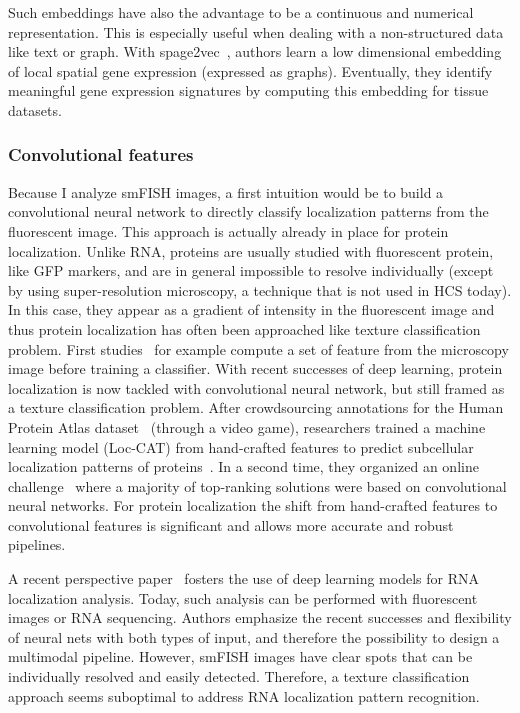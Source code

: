 Such embeddings have also the advantage to be a continuous and numerical representation.
This is especially useful when dealing with a non-structured data like text or graph.
With spage2vec~\cite{Partel_2021}, authors learn a low dimensional embedding of local spatial gene expression (expressed as graphs).
Eventually, they identify meaningful gene expression signatures by computing this embedding for tissue datasets.

\subsubsection{Convolutional features}

Because I analyze smFISH images, a first intuition would be to build a convolutional neural network to directly classify localization patterns from the fluorescent image.
This approach is actually already in place for protein localization.
Unlike RNA, proteins are usually studied with fluorescent protein, like \ac{GFP} markers, and are in general impossible to resolve individually (except by using super-resolution microscopy, a technique that is not used in HCS today).
In this case, they appear as a gradient of intensity in the fluorescent image and thus protein localization has often been approached like texture classification problem.
First studies~\cite{boland_automated_1998} for example compute a set of feature from the microscopy image before training a classifier.
With recent successes of deep learning, protein localization is now tackled with convolutional neural network, but still framed as a texture classification problem.
After crowdsourcing annotations for the Human Protein Atlas dataset~\cite{Uhlen_2015} (through a video game), researchers trained a machine learning model (Loc-CAT) from hand-crafted features to predict subcellular localization patterns of proteins~\cite{sullivan_deep_2018}.
In a second time, they organized an online challenge~\cite{ouyang_analysis_2019} where a majority of top-ranking solutions were based on convolutional neural networks.
For protein localization the shift from hand-crafted features to convolutional features is significant and allows more accurate and robust pipelines.

A recent perspective paper~\cite{Savulescu_2021} fosters the use of deep learning models for RNA localization analysis.
Today, such analysis can be performed with fluorescent images or RNA sequencing.
Authors emphasize the recent successes and flexibility of neural nets with both types of input, and therefore the possibility to design a multimodal pipeline.
However, smFISH images have clear spots that can be individually resolved and easily detected.
Therefore, a texture classification approach seems suboptimal to address \ac{RNA} localization pattern recognition.

